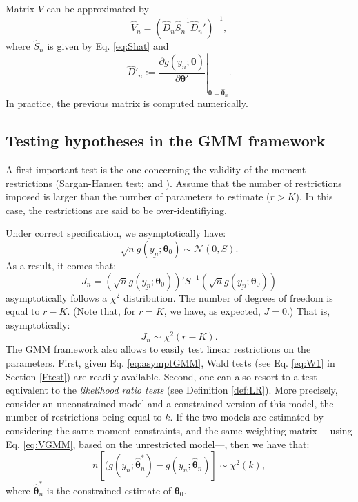 \documentclass[
  12pt,
]{book}
\theoremstyle{definition}
\theoremstyle{definition}
\theoremstyle{definition}
\theoremstyle{definition}
\theoremstyle{remark}
\begin{document}
Matrix \(V\) can be approximated by
\begin{equation}
\hat{V}_n = (\hat{D}_n\hat{S}_n^{-1}\hat{D}_n')^{-1},\label{eq:VGMM}
\end{equation}
where \(\hat{S}_n\) is given by Eq. \eqref{eq:Shat} and
\[
\hat{D}'_n := \left.\frac{\partial g(\underline{y_n};\boldsymbol\theta)}{\partial \boldsymbol\theta'}\right|_{\boldsymbol\theta = \hat{\boldsymbol\theta}_n}.
\]
In practice, the previous matrix is computed numerically.

\hypertarget{overidentif}{%
\subsection{Testing hypotheses in the GMM framework}\label{overidentif}}

A first important test is the one concerning the validity of the moment restrictions (Sargan-Hansen test; \citet{Sargan_1958} and \citet{Hansen_1982}). Assume that the number of restrictions imposed is larger than the number of parameters to estimate (\(r>K\)). In this case, the restrictions are said to be over-identifiying.

Under correct specification, we asymptotically have:
\[
\sqrt{n}g(\underline{y_n};{\boldsymbol\theta}_0)  \sim \mathcal{N}(0,S).
\]
As a result, it comes that:
\begin{equation}
J_n = \left(\sqrt{n}g(\underline{y_n};{\boldsymbol\theta}_0)\right)'S^{-1}\left(\sqrt{n}g(\underline{y_n};{\boldsymbol\theta}_0)\right) \label{eq:HansenSargan}
\end{equation}
asymptotically follows a \(\chi^2\) distribution. The number of degrees of freedom is equal to \(r-K\). (Note that, for \(r=K\), we have, as expected, \(J=0\).) That is, asymptotically:
\[
J_n \sim \chi^2(r-K).
\]
The GMM framework also allows to easily test linear restrictions on the parameters. First, given Eq. \eqref{eq:asymptGMM}, Wald tests (see Eq. \eqref{eq:W1} in Section \ref{Ftest}) are readily available. Second, one can also resort to a test equivalent to the \emph{likelihood ratio tests} (see Definition \ref{def:LR}). More precisely, consider an unconstrained model and a constrained version of this model, the number of restrictions being equal to \(k\). If the two models are estimated by considering the same moment constraints, and the same weighting matrix ---using Eq. \eqref{eq:VGMM}, based on the unrestricted model---, then we have that:
\[
n \left[(g(\underline{y_n};\hat{{\boldsymbol\theta}}^*_n)-g(\underline{y_n};\hat{{\boldsymbol\theta}}_n)\right] \sim \chi^2(k),
\]
where \(\hat{{\boldsymbol\theta}}^*_n\) is the constrained estimate of \({\boldsymbol\theta}_0\).
\end{document}
